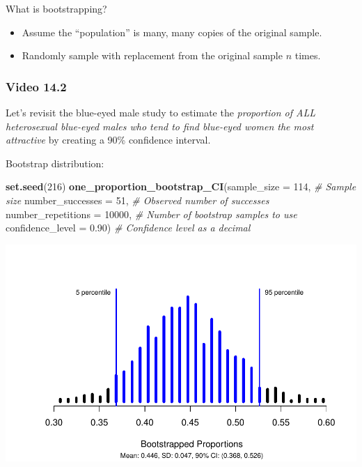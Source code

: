 \documentclass[
]{report}
\newenvironment{Shaded}{\begin{snugshade}}{\end{snugshade}}
\newcommand{\AttributeTok}[1]{\textcolor[rgb]{0.13,0.29,0.53}{#1}}
\newcommand{\CommentTok}[1]{\textcolor[rgb]{0.56,0.35,0.01}{\textit{#1}}}
\newcommand{\DecValTok}[1]{\textcolor[rgb]{0.00,0.00,0.81}{#1}}
\newcommand{\FloatTok}[1]{\textcolor[rgb]{0.00,0.00,0.81}{#1}}
\newcommand{\FunctionTok}[1]{\textcolor[rgb]{0.13,0.29,0.53}{\textbf{#1}}}
\newcommand{\NormalTok}[1]{#1}
\begin{document}
What is bootstrapping?

\begin{itemize}
\item
  Assume the ``population'' is many, many copies of the original sample.
\item
  Randomly sample with replacement from the original sample \(n\) times.
\end{itemize}

\subsubsection*{Video 14.2}\label{video-14.2}

Let's revisit the blue-eyed male study to estimate the \emph{proportion of ALL heterosexual blue-eyed males who tend to find blue-eyed women the most attractive} by creating a 90\% confidence interval.

Bootstrap distribution:

\begin{Shaded}
\begin{Highlighting}[]
\FunctionTok{set.seed}\NormalTok{(}\DecValTok{216}\NormalTok{)}
\FunctionTok{one\_proportion\_bootstrap\_CI}\NormalTok{(}\AttributeTok{sample\_size =} \DecValTok{114}\NormalTok{, }\CommentTok{\# Sample size}
                    \AttributeTok{number\_successes =} \DecValTok{51}\NormalTok{, }\CommentTok{\# Observed number of successes}
                    \AttributeTok{number\_repetitions =} \DecValTok{10000}\NormalTok{, }\CommentTok{\# Number of bootstrap samples to use}
                    \AttributeTok{confidence\_level =} \FloatTok{0.90}\NormalTok{) }\CommentTok{\# Confidence level as a decimal}
\end{Highlighting}
\end{Shaded}

\begin{center}\includegraphics[width=0.7\linewidth]{03-VN03-EDA_OneCatSimulation_files/figure-latex/unnamed-chunk-9-1} \end{center}
\end{document}
